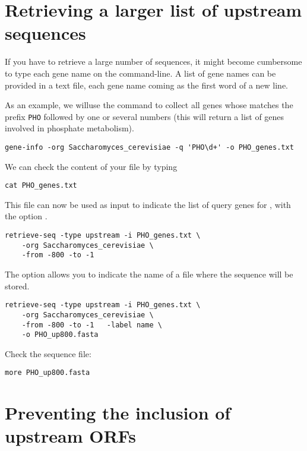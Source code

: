 \section{Retrieving a larger list of upstream sequences}

If you have to retrieve a large number of sequences, it might become
cumbersome to type each gene name on the command-line. A list of gene
names can be provided in a text file, each gene name coming as the
first word of a new line.

As an example, we willuse the command  to collect
all genes whose matches the prefix \texttt{PHO} followed by one or
several numbers (this will return a list of genes involved in
phosphate metabolism).

\begin{lstlisting}
gene-info -org Saccharomyces_cerevisiae -q 'PHO\d+' -o PHO_genes.txt
\end{lstlisting}

We can check the content of your file by typing

\begin{lstlisting}
cat PHO_genes.txt
\end{lstlisting}

This file can now be used as input to indicate the list of query genes
for , with the option .

\begin{lstlisting}
retrieve-seq -type upstream -i PHO_genes.txt \
    -org Saccharomyces_cerevisiae \
    -from -800 -to -1  
\end{lstlisting}

The option  allows you to indicate the name of a file where
the sequence will be stored.

\begin{lstlisting}
retrieve-seq -type upstream -i PHO_genes.txt \
    -org Saccharomyces_cerevisiae \
    -from -800 -to -1   -label name \
    -o PHO_up800.fasta
\end{lstlisting}

Check the sequence file:

\begin{lstlisting}
more PHO_up800.fasta
\end{lstlisting}


\section{Preventing the inclusion of upstream ORFs}

